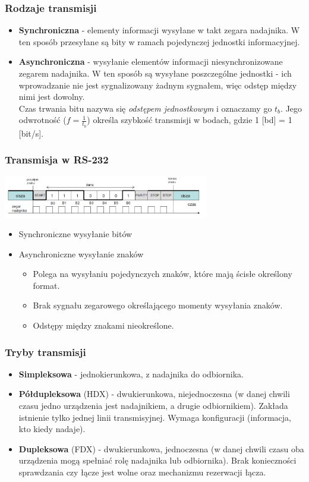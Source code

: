 		\subsubsection{Rodzaje transmisji}
		\begin{itemize}
			\item \textbf{Synchroniczna} - elementy informacji wysyłane w takt zegara nadajnika. W ten sposób przesyłane są bity w ramach pojedynczej jednostki informacyjnej.
			\item \textbf{Asynchroniczna} - wysyłanie elementów informacji niesynchronizowane zegarem nadajnika. W ten sposób są wysyłane poszczególne jednostki - ich wprowadzanie nie jest sygnalizowany żadnym sygnałem, więc odstęp między nimi jest dowolny.\\
			Czas trwania bitu nazywa się \emph{odstępem jednostkowym} i oznaczamy go $t_{b}$. Jego odwrotność ($f=\frac{1}{t_{b}}$) określa szybkość transmisji w bodach, gdzie 1 [bd] = 1 [bit/s].
		\end{itemize}
		\subsubsection{Transmisja w RS-232}
		\includegraphics[width=9cm]{./wyklady/RS232_4_1.jpg}
		\begin{itemize}
			\item Synchroniczne wysyłanie bitów
			\item Asynchroniczne wysyłanie znaków
			\begin{itemize}
				\item Polega na wysyłaniu pojedynczych znaków, które mają ścisłe określony format.
				\item Brak sygnału zegarowego określającego momenty wysyłania znaków.
				\item Odstępy między znakami nieokreślone.
			\end{itemize}
		\end{itemize}
		\subsubsection{Tryby transmisji}
		\begin{itemize}
			\item \textbf{Simpleksowa} - jednokierunkowa, z nadajnika do odbiornika.
			\item \textbf{Półdupleksowa} (HDX) - dwukierunkowa, niejednoczesna (w danej chwili czasu jedno urządzenia jest nadajnikiem, a drugie odbiornikiem). Zakłada istnienie tylko jednej linii transmisyjnej. Wymaga konfiguracji (informacja, kto kiedy nadaje).
			\item \textbf{Dupleksowa} (FDX) - dwukierunkowa, jednoczesna (w danej chwili czasu oba urządzenia mogą spełniać rolę nadajnika lub odbiornika). Brak konieczności sprawdzania czy łącze jest wolne oraz mechanizmu rezerwacji łącza.
		\end{itemize}
	\newpage
